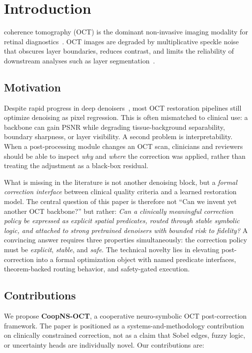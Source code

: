 \documentclass{ieeetj}
\begin{document}
\maketitle

\section{Introduction}
\label{sec:introduction}
 coherence tomography (OCT) is the dominant non-invasive imaging modality for retinal diagnostics~\cite{huang1991optical}. OCT images are degraded by multiplicative speckle noise~\cite{goodman2007speckle} that obscures layer boundaries, reduces contrast, and limits the reliability of downstream analyses such as layer segmentation~\cite{devalla2018drunet}.

\subsection{Motivation}
Despite rapid progress in deep denoisers~\cite{zhang2017beyond,chen2022simple,liang2021swinir,krull2019noise2void}, most OCT restoration pipelines still optimize denoising as pixel regression. This is often mismatched to clinical use: a backbone can gain PSNR while degrading tissue-background separability, boundary sharpness, or layer visibility. A second problem is interpretability. When a post-processing module changes an OCT scan, clinicians and reviewers should be able to inspect \emph{why} and \emph{where} the correction was applied, rather than treating the adjustment as a black-box residual.

What is missing in the literature is not another denoising block, but a \emph{formal correction interface} between clinical quality criteria and a learned restoration model. The central question of this paper is therefore not ``Can we invent yet another OCT backbone?'' but rather: \emph{Can a clinically meaningful correction policy be expressed as explicit spatial predicates, routed through stable symbolic logic, and attached to strong pretrained denoisers with bounded risk to fidelity?} A convincing answer requires three properties simultaneously: the correction policy must be \emph{explicit}, \emph{stable}, and \emph{safe}. The technical novelty lies in elevating post-correction into a formal optimization object with named predicate interfaces, theorem-backed routing behavior, and safety-gated execution.

\subsection{Contributions}
We propose \textbf{CoopNS-OCT}, a cooperative neuro-symbolic OCT post-correction framework. The paper is positioned as a systems-and-methodology contribution on clinically constrained correction, not as a claim that Sobel edges, fuzzy logic, or uncertainty heads are individually novel. Our contributions are:
\end{document}
